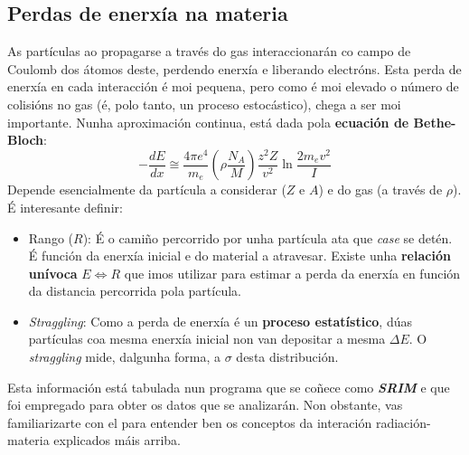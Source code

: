 \documentclass[11pt, a4paper]{article}
\begin{document}
\subsection{Perdas de enerxía na materia}\label{sec:de}
As partículas ao propagarse a través do gas interaccionarán co campo de Coulomb dos átomos deste, perdendo enerxía e liberando electróns. Esta perda de enerxía en cada interacción é moi pequena, pero como é moi elevado o número de colisións no gas (é, polo tanto, un proceso estocástico), chega a ser moi importante. Nunha aproximación continua, está dada pola \textbf{ecuación de Bethe-Bloch}:
\begin{equation*}\label{eq:stopping}
    - \frac{dE}{dx} \cong \frac{4 \pi e^4}{m_e} \left(\rho \frac{N_A}{M}\right)\frac{z^2 Z}{v^2} \ln{\frac{2m_e v^2}{I}}
\end{equation*}
Depende esencialmente da partícula a considerar ($Z$ e $A$) e do gas (a través de $\rho$). É interesante definir:
\begin{itemize}
    \item Rango ($R$): É o camiño percorrido por unha partícula ata que \textit{case} se detén. É función da enerxía inicial e do material a atravesar. Existe unha \textbf{relación unívoca} $E \Longleftrightarrow R$ que imos utilizar para estimar a perda da enerxía en función da distancia percorrida pola partícula.
    \item \textit{Straggling}: Como a perda de enerxía é un \textbf{proceso estatístico}, dúas partículas coa mesma enerxía inicial non van depositar a mesma $\Delta E$. O \textit{straggling} mide, dalgunha forma, a $\sigma$ desta distribución.
\end{itemize}
Esta información está tabulada nun programa que se coñece como \textit{\textbf{SRIM}} e que foi empregado para obter os datos que se analizarán. Non obstante, vas familiarizarte con el para entender ben os conceptos da interación radiación-materia explicados máis arriba.

\end{document}
